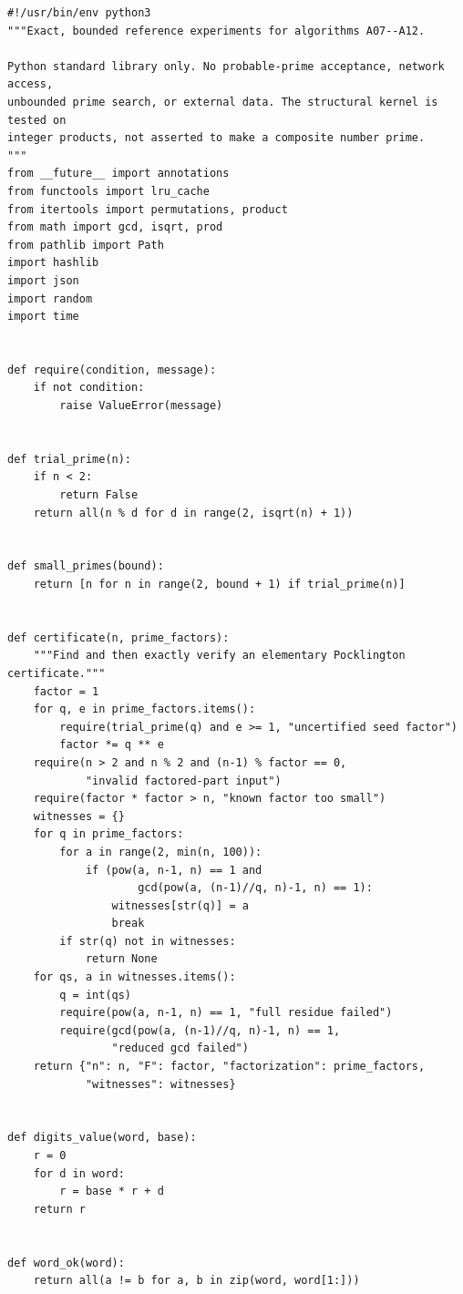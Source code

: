 \documentclass[11pt,a4paper]{article}
\theoremstyle{definition}\newtheorem{definition}[theorem]{Definition}
\theoremstyle{remark}\newtheorem{remark}[theorem]{Remark}
\begin{document}
\begin{lstlisting}[label=lst:arithmetic]
#!/usr/bin/env python3
"""Exact, bounded reference experiments for algorithms A07--A12.

Python standard library only. No probable-prime acceptance, network access,
unbounded prime search, or external data. The structural kernel is tested on
integer products, not asserted to make a composite number prime.
"""
from __future__ import annotations
from functools import lru_cache
from itertools import permutations, product
from math import gcd, isqrt, prod
from pathlib import Path
import hashlib
import json
import random
import time


def require(condition, message):
    if not condition:
        raise ValueError(message)


def trial_prime(n):
    if n < 2:
        return False
    return all(n % d for d in range(2, isqrt(n) + 1))


def small_primes(bound):
    return [n for n in range(2, bound + 1) if trial_prime(n)]


def certificate(n, prime_factors):
    """Find and then exactly verify an elementary Pocklington certificate."""
    factor = 1
    for q, e in prime_factors.items():
        require(trial_prime(q) and e >= 1, "uncertified seed factor")
        factor *= q ** e
    require(n > 2 and n % 2 and (n-1) % factor == 0,
            "invalid factored-part input")
    require(factor * factor > n, "known factor too small")
    witnesses = {}
    for q in prime_factors:
        for a in range(2, min(n, 100)):
            if (pow(a, n-1, n) == 1 and
                    gcd(pow(a, (n-1)//q, n)-1, n) == 1):
                witnesses[str(q)] = a
                break
        if str(q) not in witnesses:
            return None
    for qs, a in witnesses.items():
        q = int(qs)
        require(pow(a, n-1, n) == 1, "full residue failed")
        require(gcd(pow(a, (n-1)//q, n)-1, n) == 1,
                "reduced gcd failed")
    return {"n": n, "F": factor, "factorization": prime_factors,
            "witnesses": witnesses}


def digits_value(word, base):
    r = 0
    for d in word:
        r = base * r + d
    return r


def word_ok(word):
    return all(a != b for a, b in zip(word, word[1:]))



\end{lstlisting}
\end{document}
